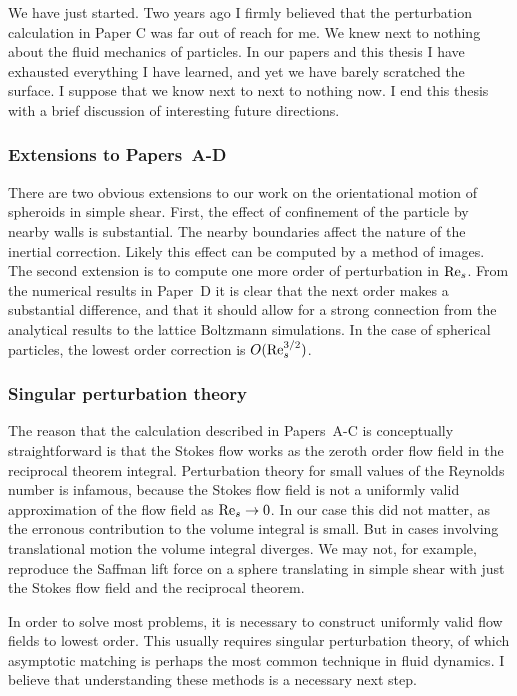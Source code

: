 \documentclass[thesis.tex]{subfiles}
\begin{document}
We have just started. Two years ago I firmly believed that the perturbation calculation in Paper C was far out of reach for me. We knew next to nothing about the fluid mechanics of particles. In our papers and this thesis I have exhausted everything I have learned, and yet we have barely scratched the surface. I suppose that we know next to next to nothing now. I end this thesis with a brief discussion of interesting future directions.

\subsubsection{Extensions to Papers~A-D}

There are two obvious extensions to our work on the orientational motion of spheroids in simple shear. First, the effect of confinement of the particle by nearby walls is substantial. The nearby boundaries affect the nature of the inertial correction. Likely this effect can be computed by a method of images. The second extension is to compute one more order of perturbation in $\textrm{Re}_s$. From the numerical results in Paper~D it is clear that the next order makes a substantial difference, and that it should allow for a strong connection from the analytical results to the lattice Boltzmann simulations. In the case of spherical particles, the lowest order correction is $O(\textrm{Re}_s^{3/2})$.

\subsubsection{Singular perturbation theory}

The reason that the calculation described in Papers~A-C is conceptually straightforward is that the Stokes flow works as the zeroth order flow field in the reciprocal theorem integral. Perturbation theory for small values of the Reynolds number is infamous, because the Stokes flow field is not a uniformly valid approximation of the flow field as $\textrm{Re}_s\to0$. In our case this did not matter, as the erronous contribution to the volume integral is small. But in cases involving translational motion the volume integral diverges. We may not, for example, reproduce the Saffman lift force on a sphere translating in simple shear with just the Stokes flow field and the reciprocal theorem.

In order to solve most problems, it is necessary to construct uniformly valid flow fields to lowest order. This usually requires singular perturbation theory, of which asymptotic matching is perhaps the most common technique in fluid dynamics. I believe that understanding these methods is a necessary next step.
\end{document}
